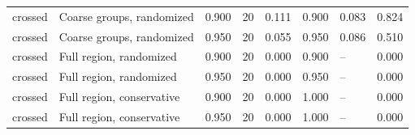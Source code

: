 \begin{table}[p]
{\begin{tabular}{llllllll}
crossed & Coarse groups, randomized & 0.900 & 20 & 0.111 & 0.900 & 0.083 & 0.824 \\
crossed & Coarse groups, randomized & 0.950 & 20 & 0.055 & 0.950 & 0.086 & 0.510 \\
crossed & Full region, randomized & 0.900 & 20 & 0.000 & 0.900 & -- & 0.000 \\
crossed & Full region, randomized & 0.950 & 20 & 0.000 & 0.950 & -- & 0.000 \\
crossed & Full region, conservative & 0.900 & 20 & 0.000 & 1.000 & -- & 0.000 \\
crossed & Full region, conservative & 0.950 & 20 & 0.000 & 1.000 & -- & 0.000 \\
\bottomrule
\end{tabular}
}
\end{table}
\begin{table}[p]
\caption{Identical classifier and cap: isolate Platt probability calibration from its additional empirical overlapping-group factors. These are exploratory source repetition medians, not the formal conditional-conformal algorithm.}
\label{tab:probability-ablation}
\centering\small
{}
\end{table}
